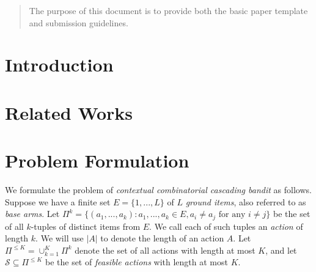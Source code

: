 \documentclass{article}
\newcommand{\cS}{\mathcal{S}}
\begin{document}
 
	
	
\begin{abstract} 
The purpose of this document is to provide both the basic paper template and submission guidelines.
\end{abstract} 
	
\section{Introduction}
	
\section{Related Works}
	
\section{Problem Formulation}

We formulate the problem of {\em contextual combinatorial cascading bandit} as follows. Suppose we have a finite set  $E=\{1,...,L\}$ of $L$ \textit{ground items},  also referred to as {\em base arms}. 
Let $\Pi^k=\{(a_1,...,a_k): a_1,...,a_k \in E, a_i \neq a_j \text{ for any } i \neq j\}$ be the set of all $k$-tuples of distinct items from $E$. We call each of such tuples an {\em action} of length $k$. We will use $|A|$ to denote the length of an action $A$.
Let $\Pi^{\leq K}= \cup_{k=1}^K \Pi^{k}$ denote the set of all actions with length
	at most $K$, and let $\cS \subseteq \Pi^{\leq K}$ be the set of \textit{feasible actions} with length at most $K$. 
\end{document}
